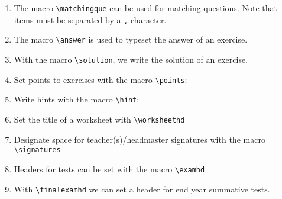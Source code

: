 \documentclass[12pt,a4page]{article}
\def\cellwidth{0.4\textwidth}
\newcommand{\miniexample}[3][t]{%
  \parbox[#1][#3][t]{\cellwidth}{#2}
}
\newcommand{\codeexample}[3][c]{%
  \colorbox[HTML]{b0c4be}{\miniexample[#1]{}{#3}}
}
\newcommand{\textexample}[3][c]{%
  {\footnotesize
    \colorbox[gray]{0.9}{\miniexample[#1]{}{#3}}%
  }
}
\newcommand{\examplerow}[3][10pt]{%
  \par\noindent\strut\hfill\codeexample{#2}{#3}\hspace{#1}\textexample{#2}{#3}\hfill\strut
}
\newlength{\exheight}
\begin{document}
\begin{enumerate}
\item The macro \verb|\matchingque| can be used for matching questions. Note that items must be
  separated by a \verb|,| character.
  \setlength{\exheight}{117pt}
  \setlength{\leftmatchwidth}{10em}
  \setlength{\rightmatchwidth}{10em}
  \examplerow{exampleMacroMatchingque.tex}{\exheight}
\item The macro \verb/\answer/ is used to typeset the answer of an exercise.
  \setlength{\exheight}{49pt}
  \examplerow{exampleMacroAnswer.tex}{\exheight}
\item With the macro \verb|\solution|, we write the solution of an exercise.
  \setlength{\exheight}{98pt}
  \examplerow{exampleMacroSolution.tex}{\exheight}
\item Set points to exercises with the macro \verb|\points|:
  \setlength{\exheight}{169pt}
  \examplerow{exampleMacroPoints.tex}{\exheight}

  \newpage

\item Write hints with the macro \verb|\hint|:
  \setlength{\exheight}{180pt}
  \examplerow{exampleMacroHint.tex}{\exheight}
\item Set the title of a worksheet with \verb|\worksheethd|
  \setlength{\exheight}{70pt}
  \examplerow{exampleMacroWorksheethd.tex}{\exheight}
\item Designate space for teacher(s)/headmaster signatures with the macro
  \verb|\signatures|
  \setlength{\exheight}{72pt}
  \setlength{\signatureslength}{80pt}
  \setlength{\signaturelineskip}{25pt}
  \examplerow{exampleMacroSignatures.tex}{\exheight}
\item Headers for tests can be set with the macro \verb|\examhd|
  \setlength{\exheight}{67pt}
  \examplerow{exampleMacroExamhd.tex}{\exheight}
\item With \verb|\finalexamhd| we can set a header for end year summative tests.
  \setlength{\exheight}{39pt}
  \examplerow{exampleMacroFinalExamhd.tex}{\exheight}


\end{enumerate}
\end{document}
